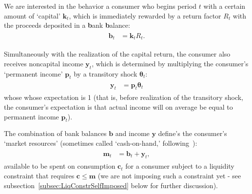 \documentclass[titlepage, headings=optiontotocandhead]{Resources/texmf-local/tex/latex/econtex}
\begin{document}
We are interested in the behavior a consumer who begins {period} $t$ with a certain amount of `capital' $\mathbf{k}_{t}$, which is immediately rewarded by a return factor $R_{t}$  with the proceeds deposited in a \textbf{b}ank \textbf{b}alance:
\begin{equation}\begin{gathered}\begin{aligned}\label{eq:bLvl}
      \mathbf{b}_{t} & = \mathbf{k}_{t}R_{t}. 
    \end{aligned}\end{gathered}\end{equation}

Simultaneously with the realization of the capital return, the consumer also receives noncapital income $\mathbf{y}_{t}$, which is determined by multiplying the consumer's `permanent income' $\mathbf{p}_{t}$ by a transitory shock $\pmb{\theta}_{t}$:
\begin{equation}\begin{gathered}\begin{aligned}
      \mathbf{y}_{t} & = \mathbf{p}_{t}\pmb{\theta}_{t} \label{eq:yLvl}
    \end{aligned}\end{gathered}\end{equation}
whose whose expectation is 1 (that is, before realization of the transitory shock, the consumer's expectation is that actual income will on average be equal to permanent income $\mathbf{p}_{t}$).

The combination of bank balances $\mathbf{b}$ and income $\mathbf{y}$ define's the consumer's `market resources' (sometimes called `cash-on-hand,' following~\cite{deatonUnderstandingC}):
\begin{equation}\begin{gathered}\begin{aligned}
      \mathbf{m}_{t} & = \mathbf{b}_{t}+\mathbf{y}_{t} \label{eq:mLvl},
    \end{aligned}\end{gathered}\end{equation}
available to be spent on consumption $\mathbf{c}_{t}$ for a consumer subject to a liquidity constraint that requires $\mathbf{c} \leq \mathbf{m}$ (we are not imposing such a constraint yet - see subsection~\ref{subsec:LiqConstrSelfImposed} below for further discussion).
\end{document}
